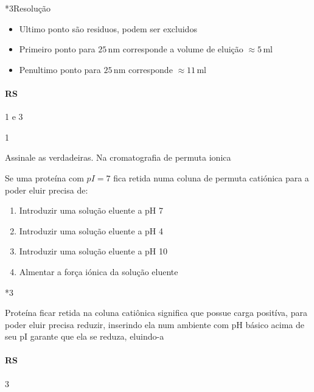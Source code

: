 \documentclass[\mainfilename]{subfiles}
\begin{document}
\begin{questionBox}
    \begin{questionBox}*3{Resolução}
        
        \begin{itemize}
            \item Ultimo ponto são residuos, podem ser excluidos
            \item Primeiro ponto para \(25\,\unit{\nano\metre}\) corresponde a volume de eluição \(\approx 5\,\unit{\milli\litre}\)
            \item Penultimo ponto para \(25\,\unit{\nano\metre}\) corresponde \(\approx 11\,\unit{\milli\litre}\)
        \end{itemize}

        \paragraph{RS} 1 e 3
        
    \end{questionBox}

\end{questionBox}

\begin{questionBox}1{}
    
    Assinale as verdadeiras. Na cromatografia de permuta ionica

    Se uma proteína com \(pI = 7\) fica retida numa coluna de permuta catiónica para a poder eluir precisa de:

    \begin{enumerate}
        \item Introduzir uma solução eluente a pH 7
        \item Introduzir uma solução eluente a pH 4
        \item Introduzir uma solução eluente a pH 10
        \item Almentar a força iónica da solução eluente
    \end{enumerate}

    \begin{questionBox}*3{}
        
        Proteína ficar retida na coluna catiônica significa que possue carga positíva, para poder eluir precisa reduzir, inserindo ela num ambiente com pH básico acima de seu pI garante que ela se reduza, eluindo-a
        
        \paragraph{RS} 3
        
    \end{questionBox}

    
\end{questionBox}
\end{document}
